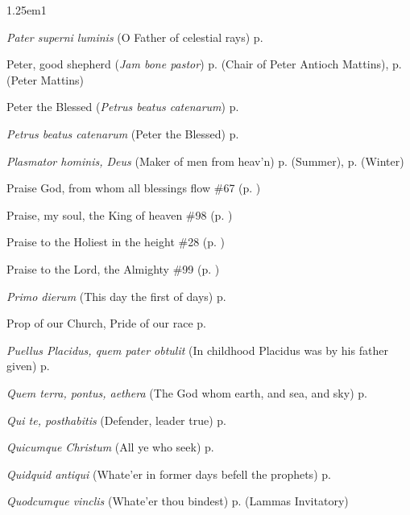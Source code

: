 \begin{hangparas}{1.25em}{1}
\par\noindent
\textit{Pater superni luminis} (O Father of celestial rays) \dotfill p. \pageref{MaryMagdaleneEvensong}
\par\noindent
Peter, good shepherd (\textit{Jam bone pastor}) \dotfill p. \pageref{PeterAntiochMattins} (Chair of Peter Antioch Mattins), p. \pageref{PeterMattins} (Peter Mattins)
\par\noindent
Peter the Blessed (\textit{Petrus beatus catenarum}) \dotfill p. \pageref{LammasEvensong}
\par\noindent
\textit{Petrus beatus catenarum} (Peter the Blessed) \dotfill p. \pageref{LammasEvensong}
\par\noindent
\textit{Plasmator hominis, Deus} (Maker of men from heav'n) \dotfill p. \pageref{FridayEvensongSummer} (Summer), p. \pageref{FridayEvensongWinter} (Winter)
\par\noindent
Praise God, from whom all blessings flow \dotfill \#67 (p. \pageref{Hymn67})
\par\noindent
Praise, my soul, the King of heaven \dotfill \#98 (p. \pageref{Hymn98})
\par\noindent
Praise to the Holiest in the height \dotfill \#28 (p. \pageref{Hymn28})
\par\noindent
Praise to the Lord, the Almighty \dotfill \#99 (p. \pageref{Hymn99})
\par\noindent
\textit{Primo dierum} (This day the first of days) \dotfill p. \pageref{SundayInvitatoryWinter}
\par\noindent
Prop of our Church, Pride of our race \dotfill p. \pageref{EliasIIEvensong}
\par\noindent
\textit{Puellus Placidus, quem pater obtulit} (In childhood Placidus was by his father given) \dotfill p. \pageref{MaurusInvitatory}
\par\noindent
\textit{Quem terra, pontus, aethera} (The God whom earth, and sea, and sky) \dotfill p. \pageref{BVMInvitatory}
\par\noindent
\textit{Qui te, posthabitis} (Defender, leader true) \dotfill p. \pageref{MaurusEvensong}
\par\noindent
\textit{Quicumque Christum} (All ye who seek) \dotfill p. \pageref{TransfigurationEvensong}
\par\noindent
\textit{Quidquid antiqui} (Whate'er in former days befell the prophets) \dotfill p. \pageref{BenedictInvitatory}
\par\noindent
\textit{Quodcumque vinclis} (Whate'er thou bindest) \dotfill p. \pageref{LammasInvitatory} (Lammas Invitatory)

\end{hangparas}
